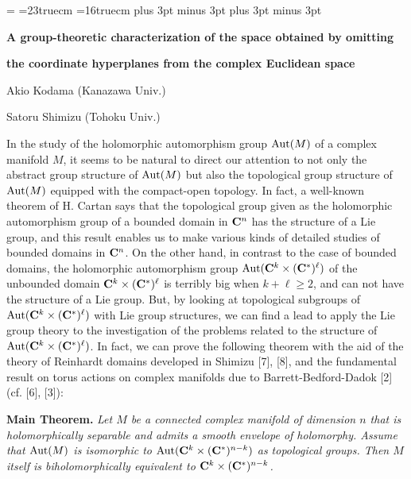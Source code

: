
\nologo
\magnification=
\parindent=15pt
\vsize=23truecm
\hsize=16truecm
\baselineskip=19pt plus 3pt minus 3pt
\document
\topspace{0.5cm}
\baselineskip=19pt plus 3pt minus 3pt
\centerline{{\bf A group-theoretic characterization of the space obtained by omitting}}
\centerline{{\bf the coordinate hyperplanes from the complex Euclidean space}}
\vskip 1cm
\noindent\hskip 7.2cm Akio Kodama \;\;(Kanazawa Univ.)\par
\noindent\hskip 7.2cm Satoru Shimizu\;\; (Tohoku Univ.)\par
\vskip 0.8cm
In the study of the holomorphic automorphism group
$\text{\rm Aut}(M)$ of a complex manifold $M$,
it seems to be natural to direct our attention to
not only the abstract group structure of $\text{\rm Aut}(M)$
but also the topological group structure of
$\text{\rm Aut}(M)$ equipped with the compact-open topology.
In fact, a well-known theorem of H. Cartan says that
the topological group given as 
the holomorphic automorphism group of
a bounded domain in $\bold C^n$
has the structure of a Lie group,
and this result enables us to make various kinds of
detailed studies of bounded domains in $\bold C^n$.
On the other hand, in contrast to the case of bounded domains,
the holomorphic automorphism group
$\text{\rm Aut}
 (\bold C^k
 \times
 (\bold C^{\ast})^{\ell})$
of the unbounded domain
$\bold C^k \times (\bold C^{\ast})^{\ell}$
is terribly big when $k + \ell \ge 2$,
and can not have the structure of a Lie group.
But, by looking at topological subgroups of 
$\text{\rm Aut}
 (\bold C^k
 \times
 (\bold C^{\ast})^{\ell})$
with Lie group structures,
we can find a lead to apply the Lie group theory to
the investigation of the problems related to
the structure of
$\text{\rm Aut}
 (\bold C^k
 \times
 (\bold C^{\ast})^{\ell})$.
In fact, we can prove the following theorem with the aid of the theory of Reinhardt domains developed in Shimizu [7], [8], and the fundamental result on torus actions on complex manifolds due to Barrett-Bedford-Dadok [2](cf. [6], [3]):\par
\vskip 0.4cm
{\bf Main Theorem.}
{\it Let $M$ be a connected complex manifold of dimension $n$
that is holomorphically separable and
admits a smooth envelope of holomorphy.
Assume that
$\text{\rm Aut}(M)$ is isomorphic to
$\text{\rm Aut}
 (\bold C^k
 \times
 (\bold C^{\ast})^{n - k})$
as topological groups.
Then $M$ itself is biholomorphically
equivalent to
$\bold C^k
 \times
 (\bold C^{\ast})^{n - k}$.}
\par
\vskip 0.4cm
